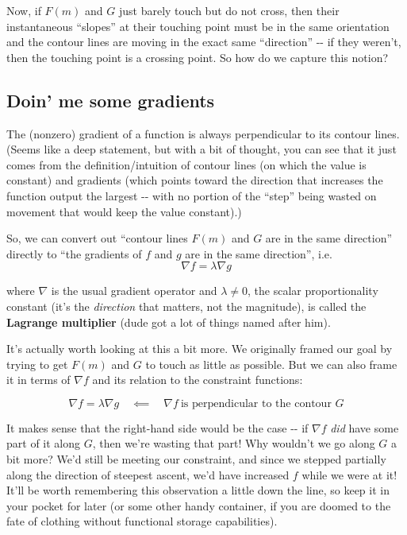 \documentclass[letterpaper,12pt]{report}
\begin{document}
Now, if \(F(m)\) and \(G\) just barely touch but do not cross, then
their instantaneous ``slopes'' at their touching point must be in the same
orientation and the contour lines are moving in the exact same
``direction'' -\/- if they weren't, then the touching point is a crossing
point. So how do we capture this notion?

\subsection{Doin' me some gradients}\label{doin-me-some-gradients}

The (nonzero) gradient of a function is always perpendicular to its
contour lines. (Seems like a deep statement, but with a bit of thought,
you can see that it just comes from the definition/intuition of contour
lines (on which the value is constant) and gradients (which points
toward the direction that increases the function output the largest -\/-
with no portion of the ``step'' being wasted on movement that would keep
the value constant).)

So, we can convert out ``contour lines \(F(m)\) and \(G\) are in the same
direction'' directly to ``the gradients of \(f\) and \(g\) are in the same
direction'', i.e. \[\nabla f = \lambda \nabla g \]

where \(\nabla\) is the usual gradient operator and \(\lambda \neq 0\),
the scalar proportionality constant (it's the \emph{direction} that
matters, not the magnitude), is called the \textbf{Lagrange multiplier}
(dude got a lot of things named after him).

It's actually worth looking at this a bit more. We originally framed our
goal by trying to get \(F(m)\) and \(G\) to touch as little as possible.
But we can also frame it in terms of \(\nabla f\) and its relation to
the constraint functions:

\[\nabla f = \lambda \nabla g \quad \impliedby \quad \nabla f \ \text{is perpendicular to the contour } G \]

It makes sense that the right-hand side would be the case -\/- if
\(\nabla f\) \emph{did} have some part of it along \(G\), then we're
wasting that part! Why wouldn't we go along \(G\) a bit more? We'd still
be meeting our constraint, and since we stepped partially along the
direction of steepest ascent, we'd have increased \(f\) while we were at
it! It'll be worth remembering this observation a little down the line,
so keep it in your pocket for later (or some other handy container, if
you are doomed to the fate of clothing without functional storage
capabilities).
\end{document}
